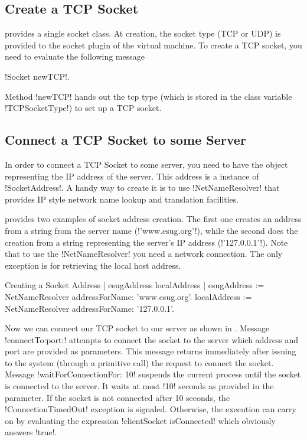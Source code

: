 \documentclass[a4paper,10pt,twoside]{book}
\begin{document}
\subsection{Create a TCP Socket}
\pharo provides a single socket class.
At creation, the socket type (TCP or UDP) is provided to the socket plugin of the virtual machine.
To create a TCP socket, you need to evaluate the following message 
\begin{center}
\ct!Socket newTCP!.
\end{center}
Method \ct!newTCP! hands out the tcp type (which is stored in the class variable \ct!TCPSocketType!) to set up a TCP socket.

\subsection{Connect a TCP Socket to some Server}
In order to connect a TCP Socket to some server, you need to have the object representing the IP address of the server.
This address is a instance of \ct!SocketAddress!.
A handy way to create it is to use \ct!NetNameResolver! that  provides IP style network name lookup and translation facilities.

 provides two examples of socket address creation.
The first one creates an address from a string from the server name (\ct!'www.esug.org'!), while the second does the creation from a string representing the server's IP address (\ct!'127.0.0.1'!).
Note that to use the \ct!NetNameResolver! you need a network connection.
The only exception is for retrieving the local host address.


\begin{script}[creatingSocketAddress]{Creating a Socket Address}
| esugAddress localAddress |
esugAddress := NetNameResolver addressForName: 'www.esug.org'.
localAddress := NetNameResolver addressForName: '127.0.0.1'.
\end{script}

Now we can connect our TCP socket to our server as shown in .
Message \ct!connectTo:port:! attempts to connect the socket to the server which address and port are provided as parameters.
This message returns immediately after issuing to the system (through a primitive call) the request to connect the socket.
Message \ct!waitForConnectionFor: 10! suspends the current process until the socket is connected to the server.
It waits at most \ct!10! seconds as provided in the parameter.
If the socket is not connected after 10 seconds, the \ct!ConnectionTimedOut! exception is signaled. 
Otherwise, the execution can carry on by evaluating the expression \ct!clientSocket isConnected! which obviously answers \ct!true!.
\end{document}
